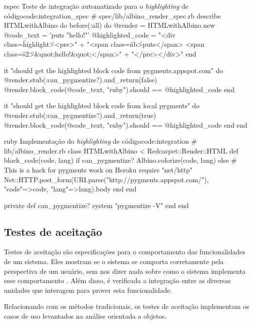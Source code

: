 \begin{mycode}{rspec}%
{Teste de integração automatizado para o \textit{highlighting} de código}{code:integration_spec}
# spec/lib/albino_render_spec.rb
describe HTMLwithAlbino do
  before(:all) do
    @render = HTMLwithAlbino.new
    @code_text = 'puts "hello!"'
    @highlighted_code =
      "<div class=\"highlight\"><pre>" +
        "<span class=\"nb\">puts</span> <span class=\"s2\">&quot;hello!&quot;</span>\n" +
      "</pre>\n</div>\n"
  end

  it "should get the highlighted block code from pygments.appspot.com" do
    @render.stub(:can_pygmentize?).and_return(false)
    @render.block_code(@code_text, "ruby").should == @highlighted_code
  end

  it "should get the highlighted block code from local pygments" do
    @render.stub(:can_pygmentize?).and_return(true)
    @render.block_code(@code_text, "ruby").should == @highlighted_code
  end
end
\end{mycode}

\begin{mycode}{ruby}%
{Implementação do \textit{highlighting} de código}{code:integration}
# lib/albino_render.rb
class HTMLwithAlbino < Redcarpet::Render::HTML
  def block_code(code, lang)
    if can_pygmentize?
      Albino.colorize(code, lang)
    else
      # This is a hack for pygments work on Heroku
      require "net/http"
      Net::HTTP.post_form(URI.parse("http://pygments.appspot.com/"),
                          {"code"=>code, "lang"=>lang}).body
    end
  end

  private
  def can_pygmentize?
    system "pygmentize -V"
  end
end
\end{mycode}


\subsection{Testes de aceitação}
\label{ssub:testes_de_aceitacao}

Testes de aceitação são especificações para o comportamento das funcionalidades de um sistema. Eles mostram se o sistema se comporta corretamente pela perspectiva de um usuário, sem nos dizer nada sobre como o sistema implementa esse comportamento \cite{TestDrivenKoskela}. Além disso, é verificada a integração entre as diversas unidades que interagem para prover esta funcionalidade.

Relacionando com os métodos tradicionais, os testes de aceitação implementam os casos de uso levantados na análise orientada a objetos.


